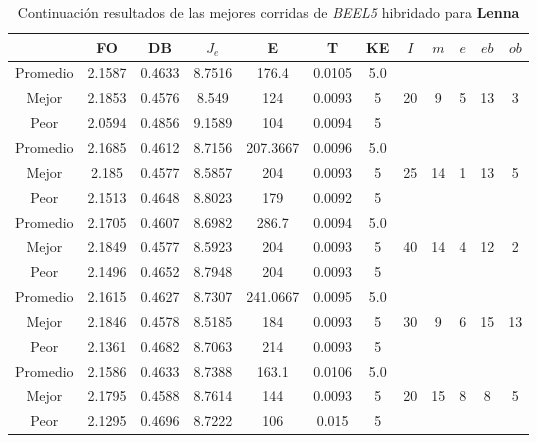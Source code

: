 \begin{table}[h!]
    \footnotesize
    \begin{center}
        \begin{tabular}{|c|c|c|c|c|c|c|c|c|c|c|c|}
        \hline
             & {\bf FO} & {\bf DB} & $J_e$ & {\bf E} & {\bf T} & {\bf KE} & $I$ & $m$ & $e$ & $eb$ & $ob$ \\
        \hline
        \hline
            Promedio  & 2.1587 & 0.4633 & 8.7516 & 176.4 & 0.0105 & 5.0 &  &  &  &  & \\
            \cline{1-7}
            Mejor & 2.1853 & 0.4576  & 8.549 & 124 & 0.0093 & 5 & 20 & 9 & 5 & 13 & 3\\
            \cline{1-7}
            Peor & 2.0594 & 0.4856  & 9.1589 & 104 & 0.0094 & 5 &  &  &  &  & \\
        \hline
        \hline
            Promedio  & 2.1685 & 0.4612 & 8.7156 & 207.3667 & 0.0096 & 5.0 &  &  &  &  & \\
            \cline{1-7}
            Mejor & 2.185 & 0.4577  & 8.5857 & 204 & 0.0093 & 5 & 25 & 14 & 1 & 13 & 5\\
            \cline{1-7}
            Peor & 2.1513 & 0.4648  & 8.8023 & 179 & 0.0092 & 5 &  &  &  &  & \\
        \hline
        \hline
            Promedio  & 2.1705 & 0.4607 & 8.6982 & 286.7 & 0.0094 & 5.0 &  &  &  &  & \\
            \cline{1-7}
            Mejor & 2.1849 & 0.4577  & 8.5923 & 204 & 0.0093 & 5 & 40 & 14 & 4 & 12 & 2\\
            \cline{1-7}
            Peor & 2.1496 & 0.4652  & 8.7948 & 204 & 0.0093 & 5 &  &  &  &  & \\
        \hline
        \hline
            Promedio  & 2.1615 & 0.4627 & 8.7307 & 241.0667 & 0.0095 & 5.0 &  &  &  &  & \\
            \cline{1-7}
            Mejor & 2.1846 & 0.4578  & 8.5185 & 184 & 0.0093 & 5 & 30 & 9 & 6 & 15 & 13\\
            \cline{1-7}
            Peor & 2.1361 & 0.4682  & 8.7063 & 214 & 0.0093 & 5 &  &  &  &  & \\
        \hline
        \hline
            Promedio  & 2.1586 & 0.4633 & 8.7388 & 163.1 & 0.0106 & 5.0 &  &  &  &  & \\
            \cline{1-7}
            Mejor & 2.1795 & 0.4588  & 8.7614 & 144 & 0.0093 & 5 & 20 & 15 & 8 & 8 & 5\\
            \cline{1-7}
            Peor & 2.1295 & 0.4696  & 8.7222 & 106 & 0.015 & 5 &  &  &  &  & \\
        \hline
        \end{tabular}
        \caption{Continuaci\'on resultados de las mejores corridas de \emph{BEEL5} hibridado para {\bf Lenna}}
        \label{tb:ctableBEEL5}
    \end{center}
\end{table}
